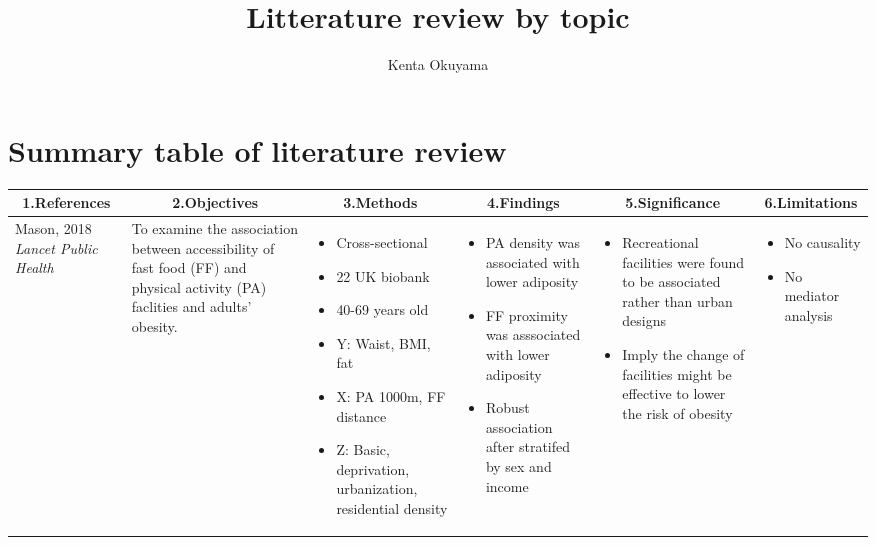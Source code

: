\documentclass{article}
\title{Litterature review by topic}
\author{Kenta Okuyama}
\begin{document}
\maketitle
{}

\section{Summary table of literature review}

\begin{longtable}[ht!]{ m{2cm} m{4cm} m{6cm} m{5cm} m{4cm} m{3cm} } %
	\hline \hline
\multicolumn{1}{c}{1.References} & \multicolumn{1}{c}{2.Objectives} & \multicolumn{1}{c}{3.Methods} & \multicolumn{1}{c}{4.Findings} & \multicolumn{1}{c}{5.Significance} & \multicolumn{1}{c}{6.Limitations} \\
	\hline
	Mason, 2018 \textit{Lancet Public Health} & 
	To examine the association between accessibility of fast food (FF) and physical activity (PA) faclities and adults' obesity. & 
	\begin{itemize}[noitemsep,topsep=0pt]
		\item Cross-sectional  \item 22 UK biobank  \item 40-69 years old  \item Y: Waist, BMI, fat  \item X: PA 1000m, FF distance \item Z: Basic, deprivation, urbanization, residential density
	\end{itemize} &
	\begin{itemize}[noitemsep,topsep=0pt]
		\item PA density was associated with lower adiposity \item FF proximity was asssociated with lower adiposity \item Robust association after stratifed by sex and income  
		\end{itemize} &
		\begin{itemize}[noitemsep,topsep=0pt] \item Recreational facilities were found to be associated rather than urban designs \item Imply the change of facilities might be effective to lower the risk of obesity
		\end{itemize} &
		\begin{itemize}[noitemsep,topsep=0pt] \item No causality \item No mediator analysis
		\end{itemize} \\
	\hline


\end{longtable}
\end{document}
